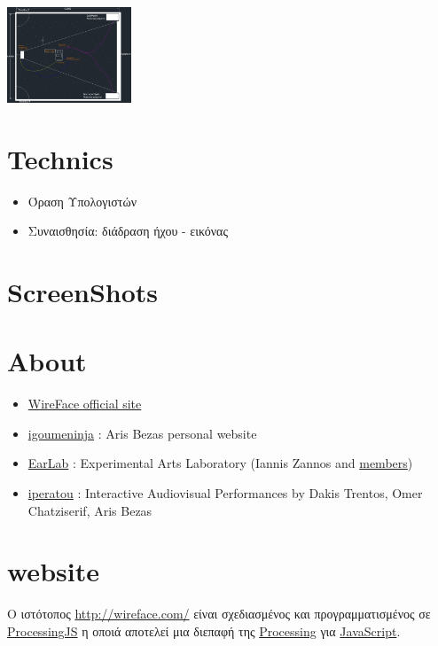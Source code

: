 \documentclass[11pt, a4paper]{scrartcl}
\begin{document}
\includegraphics[width=10em]{./../installation/wireface_setup.png}
 
\section{Technics}
\label{sec-4}


\begin{itemize}
\item Όραση Υπολογιστών
\item Συναισθησία: διάδραση ήχου - εικόνας
\end{itemize}
\section{ScreenShots}
\label{sec-5}

\begin{center}

\end{center}
\section{About}
\label{sec-6}

\begin{itemize}
\item \href{http://wireface.com/}{WireFace official site}
\item \href{http://igoumeninja.org/}{igoumeninja} : Aris Bezas personal website
\item \href{http://earlab.org/}{EarLab} : Experimental Arts Laboratory (Iannis Zannos and \href{http://earlab.org/pmwiki.php?n=Members/HomePage}{members})
\item \href{http://iperatou.com/}{iperatou} : Interactive Audiovisual Performances by Dakis Trentos, Omer Chatziserif, Aris Bezas
\end{itemize}
\section{website}
\label{sec-7}

Ο ιστότοπος \href{http://wireface.com/}{http://wireface.com/} είναι σχεδιασμένος και προγραμματισμένος σε
\href{http://processingjs.org/}{ProcessingJS} η οποιά αποτελεί μια διεπαφή της \href{http://processing.org/}{Processing} για \href{http://en.wikipedia.org/wiki/JavaScript}{JavaScript}. 
\end{document}
